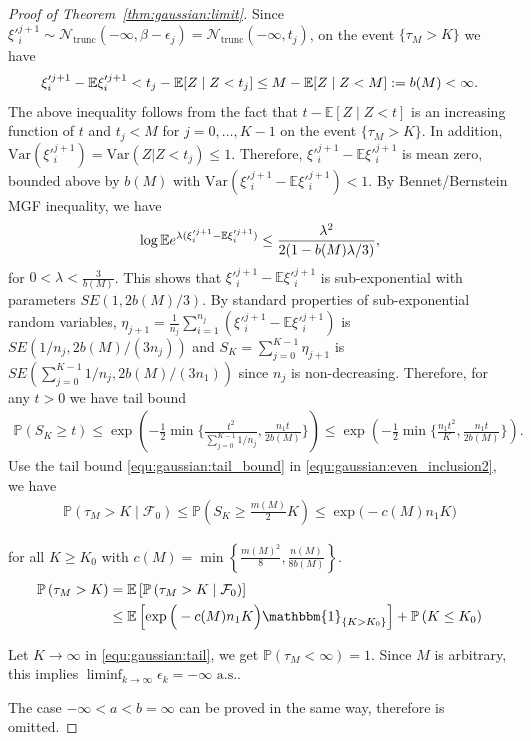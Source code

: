 \begin{proof}[Proof of Theorem~\ref{thm:gaussian:limit}]
Since $\xi'^{j+1}_i \sim \mathcal{N}_{\text{trunc}}(-\infty,\beta - \epsilon_j) = \mathcal{N}_{\text{trunc}}(-\infty, t_j)$, 
on the event $\{\tau_M > K\}$ we have 
\begin{align}
\xi'^{j+1}_i - \mathbb{E}\xi'^{j+1}_i < t_j - \mathbb{E}[Z\mid Z < t_j] \leq M - \mathbb{E}[Z\mid Z < M] := b(M) <\infty.\notag
\end{align}
The above inequality follows from the fact that $t - \mathbb{E}[Z\mid Z < t]$ is an increasing function of $t$ and 
$t_j < M$ for $j = 0, \dots, K-1$ on the event $\{\tau_M > K\}$. In addition, $\mathrm{Var}(\xi'^{j+1}_i) = \mathrm{Var}(Z|Z < t_j) \leq 1$.
Therefore, $\xi'^{j+1}_i - \mathbb{E}\xi'^{j+1}_i$ is mean zero, bounded above by $b(M)$ with $\mathrm{Var}\left(\xi'^{j+1}_i - \mathbb{E}\xi'^{j+1}_i\right) < 1$.
By Bennet/Bernstein MGF inequality, we have
\begin{align}
    \log \mathbb{E}e^{\lambda(\xi'^{j+1}_i - \mathbb{E}\xi'^{j+1}_i)} \leq \frac{\lambda^2}{2(1 - b(M)\lambda/3)},\notag
\end{align}
for $0<\lambda<\frac{3}{b(M)}$. This shows that $\xi'^{j+1}_i - \mathbb{E}\xi'^{j+1}_i$ is sub-exponential with parameters $SE(1,2b(M)/3)$.
By standard properties of sub-exponential random variables, $\eta_{j+1} = \frac{1}{n_j}\sum_{i=1}^{n_j}\left(\xi'^{j+1}_i -\mathbb{E}\xi'^{j+1}_i\right)$ is $SE(1/n_j, 2b(M)/(3n_j))$ and $S_K = \sum_{j=0}^{K-1} \eta_{j+1}$ is $SE(\sum_{j=0}^{K-1} 1/n_j, 2b(M)/(3n_1))$ since $n_j$ is non-decreasing.
Therefore, for any $t > 0$ we have tail bound
\begin{align}\label{equ:gaussian:tail_bound}
\mathbb{P}\left( S_K \geq t \right) \leq \exp\left(-\frac{1}{2}\min\{\frac{t^2}{\sum_{j=0}^{K-1} 1/n_j},\frac{n_1t}{2b(M)}\}\right) \leq \exp\left(-\frac{1}{2}\min\{\frac{n_1t^2}{K},\frac{n_1t}{2b(M)}\}\right).
\end{align}
Use the tail bound \eqref{equ:gaussian:tail_bound} in \eqref{equ:gaussian:even_inclusion2}, we have 
\begin{align}
\mathbb{P}\left(\tau_M > K\mid \mathcal{F}_0\right) \leq \mathbb{P}\left( S_K \geq \frac{m(M)}{2} K \right) \leq \exp\Big(-c(M)n_1 K\Big)
\end{align}

for all $K \geq K_0$ with $c(M) = \min\left\{\frac{m(M)^2}{8},\frac{n(M)}{8b(M)}\right\}$.
\begin{align}\label{equ:gaussian:tail}
\mathbb{P}\left( \tau_M > K \right) &= \mathbb{E} \left[\mathbb{P}\left( \tau_M > K \mid \mathcal{F}_0 \right)\right]\notag\\
&\le\mathbb{E} \left[\exp\Big(-c(M)n_1K\Big)\mathbbm{1}_{\{K > K_0\}}\right]+\mathbb{P}\left( K \leq K_0 \right)
\end{align}

Let $K \to \infty$ in \eqref{equ:gaussian:tail}, we get $\mathbb{P}(\tau_M < \infty) = 1$. Since $M$ is arbitrary, this implies $\liminf_{k \to \infty} \epsilon_k = -\infty \text{ a.s.}$.

The case $-\infty < a < b = \infty$ can be proved in the same way, therefore is omitted.

\end{proof}


